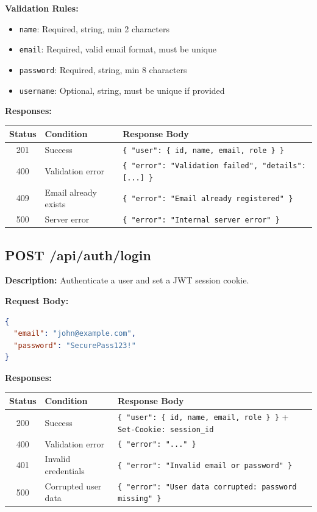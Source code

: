 \documentclass[12pt,a4paper]{report}
\begin{document}
\textbf{Validation Rules:}
\begin{itemize}[leftmargin=1.5em]
  \item \texttt{name}: Required, string, min 2 characters
  \item \texttt{email}: Required, valid email format, must be unique
  \item \texttt{password}: Required, string, min 8 characters
  \item \texttt{username}: Optional, string, must be unique if provided
\end{itemize}

\textbf{Responses:}
\begin{center}
\begin{tabular}{clp{7cm}}
  \toprule
  \textbf{Status} & \textbf{Condition} & \textbf{Response Body} \\
  \midrule
  201 & Success & \texttt{\{ "user": \{ id, name, email, role \} \}} \\
  400 & Validation error & \texttt{\{ "error": "Validation failed", "details": [...] \}} \\
  409 & Email already exists & \texttt{\{ "error": "Email already registered" \}} \\
  500 & Server error & \texttt{\{ "error": "Internal server error" \}} \\
  \bottomrule
\end{tabular}
\end{center}

\subsection{POST /api/auth/login}

\textbf{Description:} Authenticate a user and set a JWT session cookie.

\textbf{Request Body:}
\begin{lstlisting}[language=JSON,caption={Login request body}]
{
  "email": "john@example.com",
  "password": "SecurePass123!"
}
\end{lstlisting}

\textbf{Responses:}
\begin{center}
\begin{tabular}{clp{7cm}}
  \toprule
  \textbf{Status} & \textbf{Condition} & \textbf{Response Body} \\
  \midrule
  200 & Success & \texttt{\{ "user": \{ id, name, email, role \} \}} + \texttt{Set-Cookie: session\_id} \\
  400 & Validation error & \texttt{\{ "error": "..." \}} \\
  401 & Invalid credentials & \texttt{\{ "error": "Invalid email or password" \}} \\
  500 & Corrupted user data & \texttt{\{ "error": "User data corrupted: password missing" \}} \\
  \bottomrule
\end{tabular}
\end{center}
\end{document}
